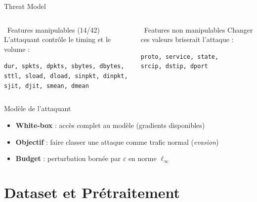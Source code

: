 \documentclass[aspectratio=169,11pt]{beamer}
\begin{document}
\begin{frame}{Threat Model}
\begin{columns}[T]
\begin{block}{\checkmark\ Features manipulables (14/42)}
L'attaquant contr\^ole le timing et le volume :
\medskip

\texttt{\footnotesize dur, spkts, dpkts, sbytes, dbytes,\\
sttl, sload, dload, sinpkt, dinpkt,\\
sjit, djit, smean, dmean}
\end{block}

\begin{alertblock}{\texttimes\ Features non manipulables}
Changer ces valeurs briserait l'attaque :
\medskip

\texttt{\footnotesize proto, service, state,\\srcip, dstip, dport}
\end{alertblock}
\end{columns}

\vspace{0.8em}
\begin{exampleblock}{Mod\`ele de l'attaquant}
\begin{itemize}
    \item \textbf{White-box} : acc\`es complet au mod\`ele (gradients disponibles)
    \item \textbf{Objectif} : faire classer une attaque comme trafic normal (\emph{evasion})
    \item \textbf{Budget} : perturbation born\'ee par $\varepsilon$ en norme $\ell_\infty$
\end{itemize}
\end{exampleblock}
\end{frame}

\section{Dataset et Pr\'etraitement}
\end{document}
